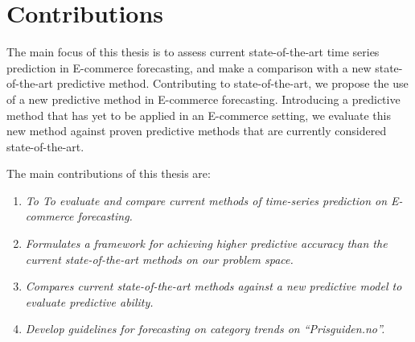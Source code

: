 \section{Contributions}
\label{sections:Introduction:Contributions}



The main focus of this thesis is to assess current state-of-the-art time series prediction in E-commerce forecasting,
and make a comparison with a new state-of-the-art predictive method.
Contributing to state-of-the-art,
we propose the use of a new predictive method in E-commerce forecasting.
Introducing a predictive method that has yet to be applied in an E-commerce setting,
we evaluate this new method against proven predictive methods that are currently considered state-of-the-art.

The main contributions of this thesis are:
\begin{enumerate}
  \item {\it To To evaluate and compare current methods of time-series prediction on E-commerce forecasting.}
  \item {\it Formulates a framework for achieving higher predictive accuracy than the current state-of-the-art methods on our problem space.}
  \item {\it Compares current state-of-the-art methods against a new predictive model to evaluate predictive ability.}
  \item {\it Develop guidelines for forecasting on category trends on ``Prisguiden.no''.}
\end{enumerate}




\iffalse
  The main focus of this work is to assess the current state of time-series prediction in E-commerce forecasting.
  Contributing to the current state of the art,
  we propose a method for increasing the predictive ability of time-series forecasting
  assessing interest trends of e-commerce product categories.
  The main contributions of this thesis are:

  \begin{enumerate}
    \item {\it To evaluate and compare current methods of time-series prediction on e-commerce.}
    \item {\it To evaluate and compare current state-of-the-art methods for time-series forecasting.}
    \item {\it Formulates a framework for achieving higher predictive accuracy than the current state-of-the-art methods on our problem space.}
  \end{enumerate}
\fi



